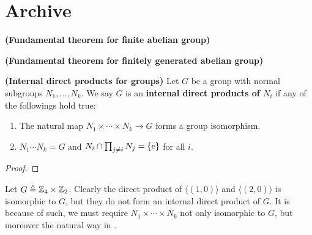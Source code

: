 \documentclass{report}
\begin{document}
\section{Archive}
\begin{theorem}
\textbf{(Fundamental theorem for finite abelian group)}
\end{theorem}
\begin{theorem}
\textbf{(Fundamental theorem for finitely generated abelian group)}
\end{theorem}
\begin{equiv_def}
\label{EDidpfg}
  \textbf{(Internal direct products for groups)} Let $G$ be a group with normal subgroups  $N_1,\dots ,N_k$. We say $G$ is an \textbf{internal direct  products of $N_i$} if any of the followings hold true: 
\begin{enumerate}[label=(\roman*)]
  \item The natural map $N_1 \times \cdots \times N_k \rightarrow G$ forms a group isomorphism. 
  \item $N_1\cdots N_k=G$ and $N_i \cap \prod_{j\neq i}N_j= \left\{ e \right\}$ for all $i$.   
\end{enumerate}
\end{equiv_def}
\begin{proof}

\end{proof}
\begin{example}
Let $G\triangleq \mathbb{Z}_4 \times \mathbb{Z}_2$. Clearly the direct product of $\langle (1,0)\rangle $ and $\langle (2,0)\rangle $ is isomorphic to $G$, but they do not form an internal direct product of  $G$. It is because of such, we must require  $N_1 \times \cdots \times N_k$ not only isomorphic to $G$, but moreover the natural way in .
\end{example}
\end{document}
